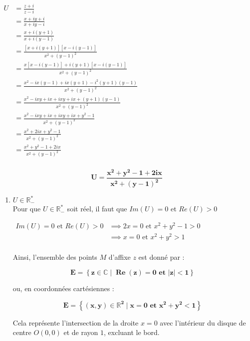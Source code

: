 \documentclass[a4paper,12pt]{article}
\begin{document}
\begin{enumerate}
    \(
    \begin{aligned}
     U&= \frac{z + i}{z - i}\\
     	&=\frac{x+iy + i}{x+iy - i}\\
     	&=\frac{x+i(y + 1)}{x+i(y - 1)}\\    
     	&=\frac{\left[ x+i(y + 1) \right]\left[ x-i(y - 1) \right]}{x^{2}+(y - 1)^{2}}\\
     	&=\frac{x\left[ x-i(y - 1) \right]+i(y + 1)\left[ x-i(y - 1) \right]}{x^{2}+(y - 1)^{2}}\\
     	&=\frac{x^{2} - ix(y - 1) + ix(y + 1) - i^{2}(y + 1)(y - 1)}{x^{2}+(y - 1)^{2}}\\   	
     	&=\frac{x^{2} - ixy + ix + ixy + ix + (y + 1)(y - 1)}{x^{2}+(y - 1)^{2}}\\ 
     	&=\frac{x^{2} - ixy + ix + ixy + ix + y^{2}-1}{x^{2}+(y - 1)^{2}}\\ 
     	&=\frac{x^{2} +2ix + y^{2}-1}{x^{2}+(y - 1)^{2}}\\ 
     	&=\frac{x^{2} + y^{2}-1+2ix}{x^{2}+(y - 1)^{2}}\\
    \end{aligned}
    \)
\begin{resultbox}
    \[
    \mathbf{U=\frac{x^{2} + y^{2}-1+2ix}{x^{2}+(y - 1)^{2}}}
    \]
\end{resultbox}
    \begin{enumerate}
        \item $U \in \mathbb{R}^*_{-}$\\
        Pour que \( U \in \mathbb{R}^*_{-} \) soit réel, il faut que \( Im(U)=0 \) et \( Re(U)>0 \) 
        
        \( 
        	\begin{aligned}
        	Im(U)=0  \text{ et }  Re(U)>0 &\implies 2x=0 \text{ et } x^{2} + y^{2}-1>0\\
        	 															&\implies x=0 \text{ et } x^{2} + y^{2}>1\\
        	\end{aligned}
        \)

Ainsi, l'ensemble des points \( M \) d'affixe \( z \) est donné par :


\begin{resultbox}
    \[
    \mathbf{E = \left\{ z \in \mathbb{C} \mid \operatorname{Re}(z) = 0 \text{ et } |z| < 1 \right\}}
    \]
\end{resultbox}

ou, en coordonnées cartésiennes :

\begin{resultbox}
    \[
    \mathbf{E = \left\{ (x, y) \in \mathbb{R}^2 \mid x = 0 \text{ et } x^2 + y^2 < 1 \right\}}
    \]
\end{resultbox}
Cela représente l'intersection de la droite \( x = 0 \) avec l'intérieur du disque de centre \( O(0,0) \) et de rayon \( 1 \), excluant le bord.


\end{enumerate}
\end{enumerate}
\end{document}
